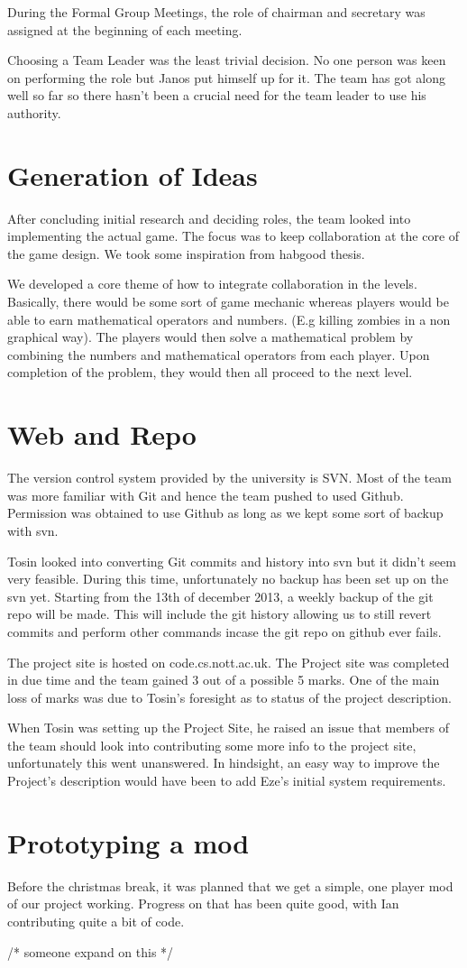 During the Formal Group Meetings, the role of chairman and 
secretary was assigned at the beginning of each meeting.

Choosing a Team Leader was the least trivial decision. No one 
person was keen on performing the role but Janos put himself 
up for it. The team has got along well so far so there hasn't 
been a crucial need for the team leader to use his authority.

\section{Generation of Ideas}
After concluding initial research and deciding roles, the team 
looked into implementing the actual game. The focus was to keep 
collaboration at the core of the game design. We took some 
inspiration from habgood thesis. 

We developed a core theme of how to integrate collaboration 
in the levels. Basically, there would be some sort of game 
mechanic whereas players would be able to earn mathematical 
operators and numbers. (E.g killing zombies in a non graphical 
way). The players would then solve a mathematical problem by 
combining the numbers and mathematical operators from each 
player. Upon completion of the problem, they would then all 
proceed to the next level.

\section{Web and Repo}
The version control system provided by the university is SVN. 
Most of the team was more familiar with Git and hence the team 
pushed to used Github. Permission was obtained to use Github 
as long as we kept some sort of backup with svn.

Tosin looked into converting Git commits and history into svn 
but it didn't seem very feasible. During this time, unfortunately 
no backup has been set up on the svn yet. Starting from the 
13th of december 2013, a weekly backup of the git repo will be 
made. This will include the git history allowing us to still 
revert commits and perform other commands incase the git repo 
on github ever fails.

The project site is hosted on code.cs.nott.ac.uk. The Project 
site was completed in due time and the team gained 3 out of a 
possible 5 marks. One of the main loss of marks was due to 
Tosin’s foresight as to status of the project description.

When Tosin was setting up the Project Site, he raised an issue 
that members of the team should look into contributing some 
more info to the project site, unfortunately this went unanswered. 
In hindsight, an easy way to improve the Project’s description 
would have been to add Eze’s initial system requirements.


\section{Prototyping a mod}
Before the christmas break, it was planned that we get a 
simple, one player mod of our project working. 
Progress on that has been quite good, with Ian contributing 
quite a bit of code.

/* someone expand on this */
